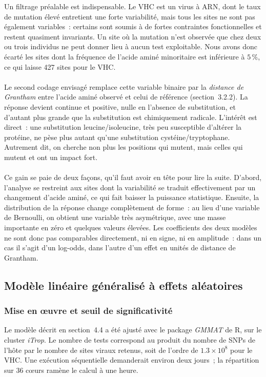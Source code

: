 \documentclass[11pt,a4paper]{article}
\begin{document}
Un filtrage préalable est indispensable. Le VHC est un virus à ARN, dont le taux de mutation
élevé entretient une forte variabilité, mais tous les sites ne sont pas également variables~:
certains sont soumis à de fortes contraintes fonctionnelles et restent quasiment invariants. Un
site où la mutation n'est observée que chez deux ou trois individus ne peut donner lieu à aucun
test exploitable. Nous avons donc écarté les sites dont la fréquence de l'acide aminé minoritaire est
inférieure à $5\,\%$, ce qui laisse 427 sites pour le VHC.
\\
\\
Le second codage envisagé remplace cette variable binaire par la \emph{distance de Grantham}
entre l'acide aminé observé et celui de référence (section~3.2.2). La réponse devient continue et
positive, nulle en l'absence de substitution, et d'autant plus grande que la substitution est
chimiquement radicale. L'intérêt est direct~: une substitution leucine/isoleucine, très peu
susceptible d'altérer la protéine, ne pèse plus autant qu'une substitution
cystéine/tryptophane. Autrement dit, on cherche non plus les positions qui mutent, mais celles
qui mutent et ont un impact fort.
\\
\\
Ce gain se paie de deux façons, qu'il faut avoir en tête pour lire la suite. D'abord, l'analyse
se restreint aux sites dont la variabilité se traduit effectivement par un changement d'acide
aminé, ce qui fait baisser la puissance statistique. Ensuite, la distribution de la réponse change complètement de forme~: au lieu d'une variable de
Bernoulli, on obtient une variable très asymétrique, avec une masse importante en zéro et
quelques valeurs élevées. Les coefficients des deux modèles ne sont donc pas comparables
directement, ni en signe, ni en amplitude~: dans un cas il s'agit d'un log-odds, dans l'autre
d'un effet en unités de distance de Grantham.
 
\subsection{Modèle linéaire généralisé à effets aléatoires}
 
\subsubsection{Mise en œuvre et seuil de significativité}
 
Le modèle décrit en section~4.4 a été ajusté avec le package \textit{GMMAT} de R, sur le cluster
\textit{iTrop}. Le nombre de tests correspond au produit du nombre de SNPs de l'hôte par le
nombre de sites viraux retenus, soit de l'ordre de $1.3\times10^{8}$ pour le VHC. Une exécution séquentielle
demanderait environ deux jours~; la répartition sur 36 c\oe{}urs ramène le calcul à une heure.
 
\end{document}
